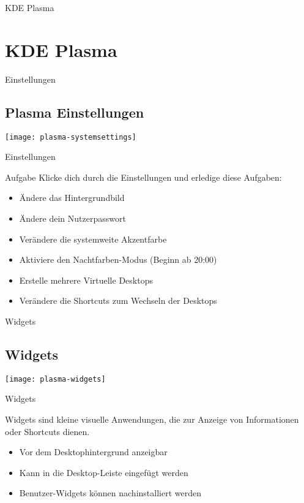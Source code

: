 
\begin{frame}{KDE Plasma}
    \section{KDE Plasma}\label{sec:KDE-Plasma}
\end{frame}

\begin{frame}{Einstellungen}
    \subsection{Plasma Einstellungen}\label{subsec:plasma-einstellungen}
    \texttt{[image: plasma-systemsettings]}
\end{frame}

\begin{frame}{Einstellungen}

    \vspace{0.5cm}
    \begin{alertblock}{Aufgabe}
        Klicke dich durch die Einstellungen und erledige diese Aufgaben:

        \pause
        \begin{itemize}
            \item Ändere das Hintergrundbild\pause
            \item Ändere dein Nutzerpasswort\pause
            \item Verändere die systemweite Akzentfarbe\pause
            \item Aktiviere den Nachtfarben-Modus (Beginn ab 20:00)\pause
            \item Erstelle mehrere Virtuelle Desktops\pause
            \item Verändere die Shortcuts zum Wechseln der Desktops
        \end{itemize}
    \end{alertblock}
\end{frame}

\begin{frame}{Widgets}
    \subsection{Widgets}\label{subsec:widgets}
    \texttt{[image: plasma-widgets]}
\end{frame}

\begin{frame}{Widgets}

    Widgets sind kleine visuelle Anwendungen, die zur Anzeige von Informationen oder Shortcuts
    dienen.

    \pause

    \begin{itemize}
        \item Vor dem Desktophintergrund anzeigbar\pause
        \item Kann in die Desktop-Leiste eingefügt werden\pause
        \item Benutzer-Widgets können nachinstalliert werden
    \end{itemize}
\end{frame}


